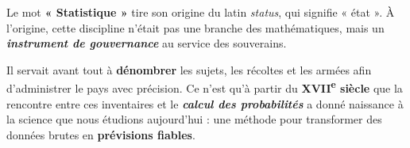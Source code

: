 \documentclass[a4paper]{book}
\begin{document}
    \begin{minipage}{0.48\linewidth}
    \end{minipage}
    \hfill
    \begin{minipage}{0.48\linewidth}
    \end{minipage}
    
        
    \begin{cultureMaths}
        Le mot \textbf{« Statistique »} tire son origine du latin \textit{status}, qui signifie « état ». À l'origine, cette discipline n'était pas une branche des mathématiques, mais un \textbf{\textit{instrument de gouvernance}} au service des souverains.
        
        Il servait avant tout à \textbf{dénombrer} les sujets, les récoltes et les armées afin d'administrer le pays avec précision. Ce n'est qu'à partir du \textbf{XVII\textsuperscript{e} siècle} que la rencontre entre ces inventaires et le \textit{\textbf{calcul des probabilités}} a donné naissance à la science que nous étudions aujourd'hui : une méthode pour transformer des données brutes en \textbf{prévisions fiables}.
    \end{cultureMaths}
\end{document}
